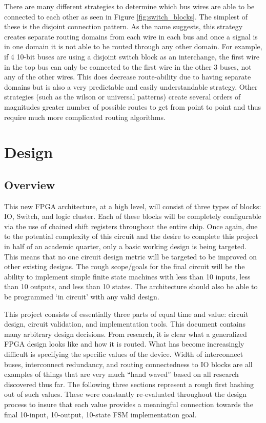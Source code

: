 \documentclass[12pt]{article}
\begin{document}
There are many different strategies to determine which bus wires are able to be connected 
to each other as seen in Figure \ref{fig:switch_blocks}. The simplest of these is the disjoint
connection pattern. As the name 
suggests, this strategy creates separate routing domains from each wire in each bus 
and once a signal is in one domain it is not able to be routed through any other 
domain. For example, if 4 10-bit buses are using a disjoint switch block as an interchange,
the first wire in the top bus can only be connected to the first wire in the other 
3 buses, not any of the other wires. This does decrease route-ability due to having 
separate domains but is also a very predictable and easily understandable strategy.
Other strategies (such as the wilson or universal patterns) create several orders 
of magnitudes greater number of possible routes to get from point to point and thus 
require much more complicated routing algorithms.

\newpage
\section{Design}

\subsection{Overview}
This new FPGA architecture, at a high level, will consist of three types of blocks:
IO, Switch, and logic cluster. Each of these blocks will be completely configurable 
via the use of chained shift registers throughout the entire chip. Once again, due 
to the potential complexity of this circuit and the desire to complete this project 
in half of an academic quarter, only a basic working design is being targeted. This 
means that no one circuit design metric will be targeted to be improved on other 
existing designs. The rough scope/goals for the final circuit will be the ability 
to implement simple finite state machines with less than 10 inputs, less than 10 
outputs, and less than 10 states. The architecture should also be able to be programmed 
‘in circuit’ with any valid design.


This project consists of essentially three parts of equal time and value: circuit 
design, circuit validation, and implementation tools. This document contains many 
arbitrary design decisions. From research, it is clear what a generalized FPGA design 
looks like and how it is routed. What has become increasingly difficult is specifying 
the specific values of the device. Width of interconnect buses, interconnect redundancy,
and routing connectedness to IO blocks are all examples of things that are very 
much “hand waved” based on all research discovered thus far. The following three 
sections represent a rough first hashing out of such values. These were constantly 
re-evaluated throughout the design process to insure that each value provides a meaningful 
connection towards the final 10-input, 10-output, 10-state FSM implementation goal.
\end{document}
